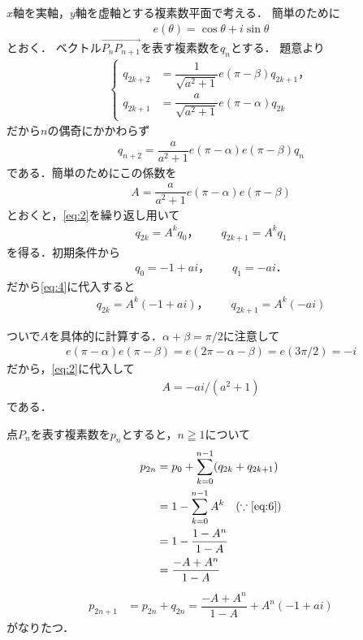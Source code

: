 \documentclass[../../main.tex]{subfiles}
\begin{document}
$x$軸を実軸，$y$軸を虚軸とする複素数平面で考える．
簡単のために
\begin{align}
  e(\theta)=\cos\theta+i\sin\theta
\end{align}
とおく．
ベクトル$\overrightarrow{P_nP_{n+1}}$を表す複素数を$q_n$とする．
題意より
\begin{align}
  \begin{cases}
    q_{2k+2}&=\dfrac{1}{\sqrt{a^2+1}}e(\pi-\beta)q_{2k+1}，\\
    q_{2k+1}&=\dfrac{a}{\sqrt{a^2+1}}e(\pi-\alpha)q_{2k}
  \end{cases} \label{eq:1}
\end{align}
だから$n$の偶奇にかかわらず
\begin{align}
  q_{n+2}=\dfrac{a}{a^2+1}e(\pi-\alpha)e(\pi-\beta)q_n \label{eq:2}
\end{align}
である．簡単のためにこの係数を
\begin{align}
  A=\dfrac{a}{a^2+1}e(\pi-\alpha)e(\pi-\beta) \label{eq:3}
\end{align}
とおくと，\cref{eq:2}を繰り返し用いて
\begin{align}
  q_{2k}=A^kq_0，\qquad q_{2k+1}=A^kq_1 \label{eq:4}
\end{align}
を得る．初期条件から
\begin{align}
  q_0=-1+ai，\qquad q_1=-ai． \label{eq:5}
\end{align}
だから\cref{eq:4}に代入すると
\begin{align}
  q_{2k}=A^k(-1+ai)，\qquad q_{2k+1}=A^k(-ai) \label{eq:6}
\end{align}

ついで$A$を具体的に計算する．$\alpha+\beta=\pi/2$に注意して
\begin{align}
  e(\pi-\alpha)e(\pi-\beta)
  =e(2\pi-\alpha-\beta)=e(3\pi/2)=-i
\end{align}
だから，\cref{eq:2}に代入して
\begin{align}
  A=-ai/(a^2+1) \label{eq:7}
\end{align}
である．

点$P_n$を表す複素数を$p_n$とすると，$n\geqq1$について
\begin{align}
  p_{2n}
  &=p_0+\sum_{k=0}^{n-1}(q_{2k}+q_{2k+1})\\
  &=1-\sum_{k=0}^{n-1}A^k \quad (\because \text{\cref{eq:6}}) \\
  &=1-\dfrac{1-A^n}{1-A} \\
  &=\dfrac{-A+A^n}{1-A} \label{eq:8}
\end{align}
\begin{align}
  p_{2n+1}
  &=p_{2n}+q_{2n}
  =\dfrac{-A+A^n}{1-A}+A^n(-1+ai) \label{eq:9}
\end{align}
がなりたつ．
\end{document}
